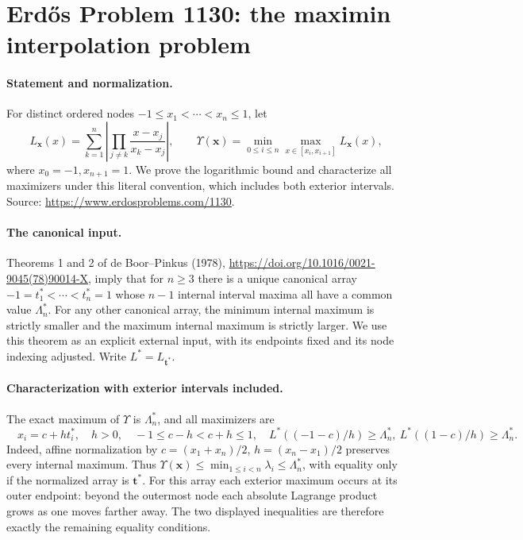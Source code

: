 \section*{Erd\H{o}s Problem 1130: the maximin interpolation problem}

\paragraph{Statement and normalization.}
For distinct ordered nodes \(-1\leq x_1<\cdots<x_n\leq1\), let
\[
 L_{\boldsymbol x}(x)=\sum_{k=1}^n
 \left|\prod_{j\ne k}\frac{x-x_j}{x_k-x_j}\right|,
 \qquad
 \Upsilon(\boldsymbol x)=\min_{0\leq i\leq n}
 \max_{x\in[x_i,x_{i+1}]}L_{\boldsymbol x}(x),
\]
where \(x_0=-1,x_{n+1}=1\). We prove the logarithmic bound and characterize all maximizers under this literal convention, which includes both exterior intervals.
Source: \url{https://www.erdosproblems.com/1130}.

\paragraph{The canonical input.}
Theorems 1 and 2 of de Boor--Pinkus (1978), \url{https://doi.org/10.1016/0021-9045(78)90014-X}, imply that for \(n\geq3\) there is a unique canonical array
\(-1=t_1^*<\cdots<t_n^*=1\) whose \(n-1\) internal interval maxima all have a common value \(\Lambda_n^*\).
For any other canonical array, the minimum internal maximum is strictly smaller and the maximum internal maximum is strictly larger.
We use this theorem as an explicit external input, with its endpoints fixed and its node indexing adjusted. Write \(L^*=L_{\boldsymbol t^*}\).

\paragraph{Characterization with exterior intervals included.}
The exact maximum of \(\Upsilon\) is \(\Lambda_n^*\), and all maximizers are
\[
 \boxed{\quad x_i=c+h t_i^*,\quad h>0,\quad
 -1\leq c-h<c+h\leq1,\quad
 L^*((-1-c)/h)\geq\Lambda_n^*,\
 L^*((1-c)/h)\geq\Lambda_n^*.\quad}
\]
Indeed, affine normalization by \(c=(x_1+x_n)/2\), \(h=(x_n-x_1)/2\) preserves every internal maximum. Thus
\(\Upsilon(\boldsymbol x)\leq\min_{1\leq i<n}\lambda_i\leq\Lambda_n^*\),
with equality only if the normalized array is \(\boldsymbol t^*\).
For this array each exterior maximum occurs at its outer endpoint: beyond the outermost node each absolute Lagrange product grows as one moves farther away. The two displayed inequalities are therefore exactly the remaining equality conditions.

